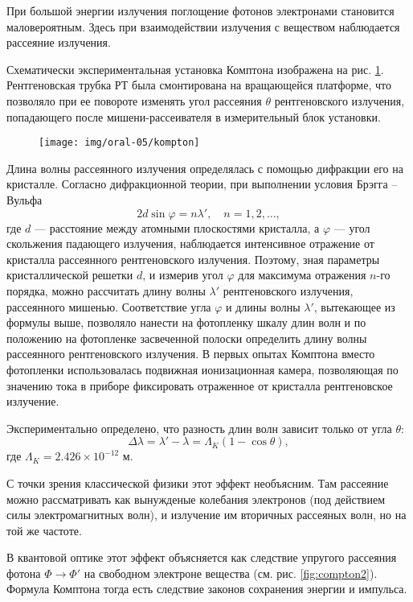 При большой энергии излучения поглощение фотонов электронами становится
маловероятным. Здесь при взаимодействии излучения с веществом наблюдается
рассеяние излучения.

Схематически экспериментальная установка Комптона 
изображена на рис. \ref{fig:kompton}. Рентгеновская трубка РТ была смонтирована
на вращающейся платформе, что позволяло при ее повороте 
изменять угол рассеяния $ \theta $ рентгеновского излучения, попадающего
после мишени-рассеивателя в измерительный блок установки.

\begin{figure}[h]
  \centering
  \texttt{[image: img/oral-05/kompton]}
  \label{fig:kompton}
\end{figure}

Длина волны рассеянного излучения определялась с помощью
дифракции его на кристалле. Согласно дифракционной теории,
при выполнении условия Брэгга -- Вульфа 
\[
    2d\sin\varphi = n\lambda', \quad n = 1,2, \ldots,
\]
где $ d $ --- расстояние между атомными плоскостями кристалла, а $ \varphi $ ---
угол скольжения падающего излучения, наблюдается 
интенсивное отражение от кристалла рассеянного рентгеновского излучения.
Поэтому, зная параметры кристаллической решетки $ d $, и измерив
угол $ \varphi $ для максимума отражения $ n $-го порядка, можно рассчитать
длину волны $ \lambda' $ рентгеновского излучения, рассеянного мишенью.
Соответствие угла $ \varphi $ и длины волны $ \lambda' $, вытекающее из формулы
выше, 
позволяло нанести на фотопленку шкалу длин волн и по положению
на фотопленке засвеченной полоски определить длину волны 
рассеянного рентгеновского излучения. В первых опытах Комптона 
вместо фотопленки использовалась подвижная ионизационная камера,
позволяющая по значению тока в приборе фиксировать отраженное
от кристалла рентгеновское излучение.

Экспериментально определено, что разность длин волн зависит только от угла $
\theta $: 
\[
    \Delta \lambda = \lambda' - \lambda = \Lambda_K (1-\cos\theta),
\]
где $ \Lambda_K = 2.426\times10^{-12} $ м.

С точки зрения классической физики этот эффект необъясним. Там рассеяние можно
рассматривать как вынужденые колебания электронов (под действием силы
электромагнитных волн), и излучение им вторичных рассеяных волн, но на той же
частоте.

В квантовой оптике этот эффект объясняется как следствие упругого рассеяния
фотона $ \Phi \to \Phi' $ на свободном электроне вещества (см. рис.
\ref{fig:compton2}). Формула Комптона тогда есть следствие законов сохранения
энергии и импульса.

